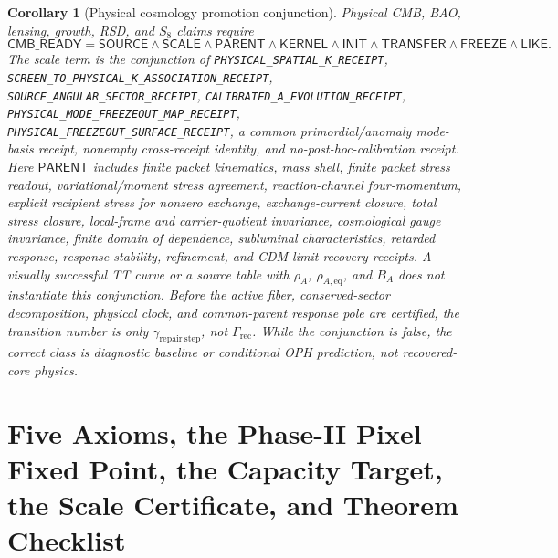 \documentclass[11pt]{article}
\newtheorem{corollary}[theorem]{Corollary}
\begin{document}
\begin{corollary}[Physical cosmology promotion conjunction]
Physical CMB, BAO, lensing, growth, RSD, and \(S_8\) claims require
\[
\mathsf{CMB\_READY}
=
\mathsf{SOURCE}\wedge
\mathsf{SCALE}\wedge
\mathsf{PARENT}\wedge
\mathsf{KERNEL}\wedge
\mathsf{INIT}\wedge
\mathsf{TRANSFER}\wedge
\mathsf{FREEZE}\wedge
\mathsf{LIKE}.
\]
The scale term is the conjunction of
\texttt{PHYSICAL\_\allowbreak SPATIAL\_\allowbreak K\_\allowbreak RECEIPT},
\texttt{SCREEN\_\allowbreak TO\_\allowbreak PHYSICAL\_\allowbreak K\_\allowbreak ASSOCIATION\_\allowbreak RECEIPT},
\texttt{SOURCE\_\allowbreak ANGULAR\_\allowbreak SECTOR\_\allowbreak RECEIPT},
\texttt{CALIBRATED\_\allowbreak A\_\allowbreak EVOLUTION\_\allowbreak RECEIPT},
\texttt{PHYSICAL\_\allowbreak MODE\_\allowbreak FREEZEOUT\_\allowbreak MAP\_\allowbreak RECEIPT},
\texttt{PHYSICAL\_\allowbreak FREEZEOUT\_\allowbreak SURFACE\_\allowbreak RECEIPT}, a common primordial/anomaly mode-basis receipt,
nonempty cross-receipt identity, and no-post-hoc-calibration receipt.
Here \(\mathsf{PARENT}\) includes finite packet kinematics, mass shell,
finite packet stress readout, variational/moment stress agreement,
reaction-channel four-momentum, explicit recipient stress for nonzero exchange,
exchange-current closure, total stress closure, local-frame and carrier-quotient
invariance, cosmological gauge invariance, finite domain of dependence,
subluminal characteristics, retarded response, response stability, refinement,
and CDM-limit recovery receipts.  A visually successful TT curve or a source
table with \(\rho_A\), \(\rho_{A,\mathrm{eq}}\), and \(B_A\) does not
instantiate this conjunction.  Before the active fiber, conserved-sector
decomposition, physical clock, and common-parent response pole are certified,
the transition number is only \(\gamma_{\mathrm{repair\ step}}\), not
\(\Gamma_{\mathrm{rec}}\).  While the conjunction is false, the correct class is
diagnostic baseline or conditional OPH prediction, not recovered-core physics.
\end{corollary}
\section{Five Axioms, the Phase-II Pixel Fixed Point, the Capacity Target, the Scale Certificate, and Theorem Checklist}\label{sec:theorem-ledger}
\end{document}

